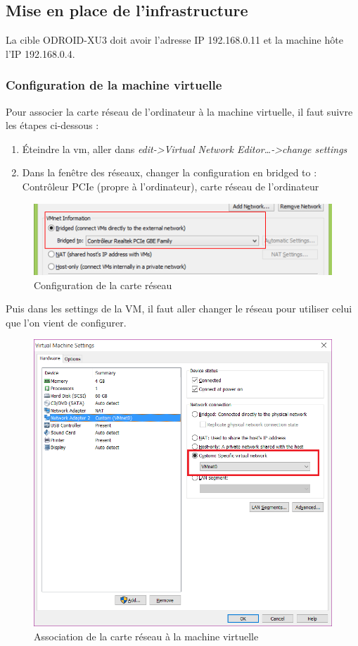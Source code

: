 \subsection{Mise en place de l'infrastructure}
La cible ODROID-XU3 doit avoir l’adresse IP 192.168.0.11 et la machine hôte l’IP 192.168.0.4.
\subsubsection{Configuration de la machine virtuelle}
Pour associer la carte réseau de l’ordinateur à la machine virtuelle, il faut suivre les étapes ci-dessous :
\begin{enumerate}
	\item Éteindre la vm, aller dans\textit{ edit->Virtual Network Editor…->change settings}
	\item Dans la fenêtre des réseaux, changer la configuration en bridged to : Contrôleur PCIe (propre à l’ordinateur), carte réseau de l’ordinateur
\end{enumerate}
\begin{figure}[H]
	\begin{center}
		\includegraphics[width=14cm]{img/vmConfig1.png}
		\caption{Configuration de la carte réseau}
		\label{evLinuxConfig1}
	\end{center}
\end{figure}
Puis dans les settings de la VM, il faut aller changer le réseau pour utiliser celui que l’on vient de configurer.
\begin{figure}[H]
	\begin{center}
		\includegraphics[width=14cm]{img/vmConfig2.png}
		\caption{Association de la carte réseau à la machine virtuelle}
		\label{evLinuxConfig2}
	\end{center}
\end{figure}
